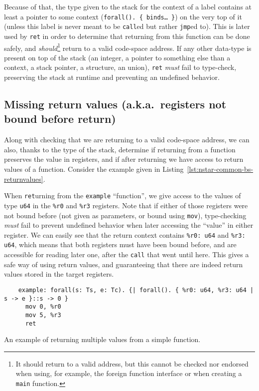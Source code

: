Because of that, the type given to the stack for the context of a label contains at least a pointer to some context (\texttt{forall(). \{ binds\ldots\ \}}) on the very top of it (unless this label is never meant to be \texttt{call}ed but rather \texttt{jmp}ed to).
This is later used by \texttt{ret} in order to determine that returning from this function can be done safely, and \textit{should}\footnote{It should return to a valid address, but this cannot be checked nor endorsed when using, for example, the foreign function interface or when creating a \texttt{main} function.} return to a valid code-space address.
If any other data-type is present on top of the stack (an integer, a pointer to something else than a context, a stack pointer, a structure, an union), \texttt{ret} \textit{must} fail to type-check, preserving the stack at runtime and preventing an undefined behavior.

\subsection{Missing return values (a.k.a.\ registers not bound before return)}\label{subsec:nstar-common-bs-restrictions-unboundregs}

Along with checking that we are returning to a valid code-space address, we can also, thanks to the type of the stack, determine if returning from a function preserves the value in registers, and if after returning we have access to return values of a function.
Consider the example given in Listing~\ref{lst:nstar-common-bs-returnvalues}.

When \texttt{ret}urning from the \texttt{example} ``function'', we give access to the values of type \texttt{u64} in the \texttt{\%r0} and \texttt{\%r3} registers.
Note that if either of those registers were not bound before (not given as parameters, or bound using \texttt{mov}), type-checking \textit{must} fail to prevent undefined behavior when later accessing the ``value'' in either register.
We can easily see that the return context contains \texttt{\%r0: u64} and \texttt{\%r3: u64}, which means that both registers must have been bound before, and are accessible for reading later one, after the \texttt{call} that went until here.
This gives a safe way of using return values, and guaranteeing that there are indeed return values stored in the target registers.

\begin{listing}[htb]
  \centering
  \begin{minipage}{0.90\textwidth}
    \begin{verbatim}
    example: forall(s: Ts, e: Tc). {| forall(). { %r0: u64, %r3: u64 | s -> e }::s -> 0 }
      mov 0, %r0
      mov 5, %r3
      ret
    \end{verbatim}
  \end{minipage}
  \caption{An example of returning multiple values from a simple function.}
  \label{lst:nstar-common-bs-returnvalues}
\end{listing}

